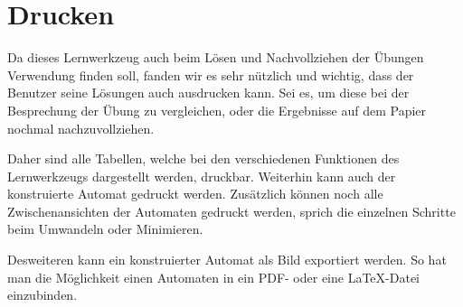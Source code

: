 



\chapter{Drucken}\label{Print}

Da dieses Lernwerkzeug auch beim Lösen und Nachvollziehen der Übungen
Verwendung finden soll, fanden wir es sehr nützlich und wichtig, dass der
Benutzer seine Lösungen auch ausdrucken kann. Sei es, um diese bei der
Besprechung der Übung zu vergleichen, oder die Ergebnisse auf dem Papier
nochmal nachzuvollziehen.\vspace{10pt}

Daher sind alle Tabellen, welche bei den verschiedenen Funktionen des
Lernwerkzeugs dargestellt werden, druckbar. Weiterhin kann auch der konstruierte
Automat gedruckt werden. Zusätzlich können noch alle Zwischenansichten der
Automaten gedruckt werden, sprich die einzelnen Schritte beim Umwandeln oder
Minimieren.\vspace{10pt}

Desweiteren kann ein konstruierter Automat als Bild exportiert werden. So hat
man die Möglichkeit einen Automaten in ein PDF- oder eine \LaTeX -Datei
einzubinden.\vspace{10pt}


